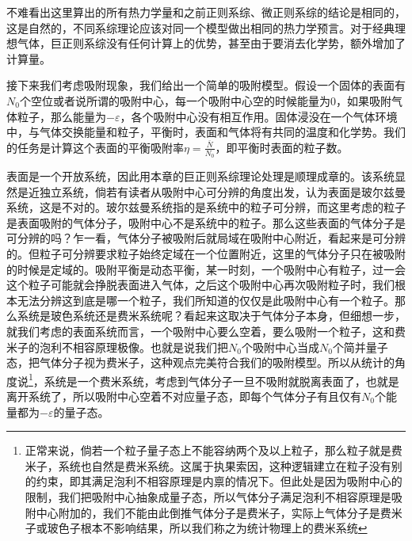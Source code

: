 \documentclass[../../main.tex]{subfiles}
\begin{document}
不难看出这里算出的所有热力学量和之前正则系综、微正则系综的结论是相同的，这是自然的，不同系综理论应该对同一个模型做出相同的热力学预言。对于经典理想气体，巨正则系综没有任何计算上的优势，甚至由于要消去化学势，额外增加了计算量。

接下来我们考虑吸附现象，我们给出一个简单的吸附模型。假设一个固体的表面有\(N_0\)个空位或者说所谓的吸附中心，每一个吸附中心空的时候能量为0，如果吸附气体粒子，那么能量为\(-\varepsilon\)，各个吸附中心没有相互作用。固体浸没在一个气体环境中，与气体交换能量和粒子，平衡时，表面和气体将有共同的温度和化学势。我们的任务是计算这个表面的平衡吸附率\(\eta=\frac{\bar{N}}{N_0}\)，即平衡时表面的粒子数。

表面是一个开放系统，因此用本章的巨正则系综理论处理是顺理成章的。该系统显然是近独立系统，倘若有读者从吸附中心可分辨的角度出发，认为表面是玻尔兹曼系统，这是不对的。玻尔兹曼系统指的是系统中的粒子可分辨，而这里考虑的粒子是表面吸附的气体分子，吸附中心不是系统中的粒子。那么这些表面的气体分子是可分辨的吗？乍一看，气体分子被吸附后就局域在吸附中心附近，看起来是可分辨的。但粒子可分辨要求粒子始终定域在一个位置附近，这里的气体分子只在被吸附的时候是定域的。吸附平衡是动态平衡，某一时刻，一个吸附中心有粒子，过一会这个粒子可能就会挣脱表面进入气体，之后这个吸附中心再次吸附粒子时，我们根本无法分辨这到底是哪一个粒子，我们所知道的仅仅是此吸附中心有一个粒子。那么系统是玻色系统还是费米系统呢？看起来这取决于气体分子本身，但细想一步，就我们考虑的表面系统而言，一个吸附中心要么空着，要么吸附一个粒子，这和费米子的泡利不相容原理极像。也就是说我们把\(N_0\)个吸附中心当成\(N_0\)个简并量子态，把气体分子视为费米子，这种观点完美符合我们的吸附模型。所以从统计的角度说\footnote{正常来说，倘若一个粒子量子态上不能容纳两个及以上粒子，那么粒子就是费米子，系统也自然是费米系统。这属于执果索因，这种逻辑建立在粒子没有别的约束，即其满足泡利不相容原理是内禀的情况下。但此处是因为吸附中心的限制，我们把吸附中心抽象成量子态，所以气体分子满足泡利不相容原理是吸附中心附加的，我们不能由此倒推气体分子是费米子，实际上气体分子是费米子或玻色子根本不影响结果，所以我们称之为统计物理上的费米系统}，系统是一个费米系统，考虑到气体分子一旦不吸附就脱离表面了，也就是离开系统了，所以吸附中心空着不对应量子态，即每个气体分子有且仅有\(N_0\)个能量都为\(-\varepsilon\)的量子态。
\end{document}
